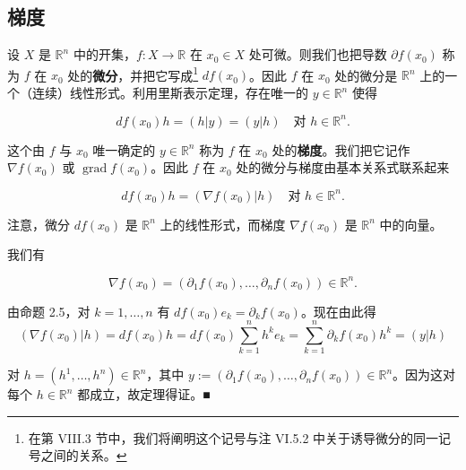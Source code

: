 \subsection*{梯度}

设 $ X $ 是 $ \mathbb{R}^n $ 中的开集，$ f : X \to \mathbb{R} $ 在 $ x_0 \in X $ 处可微。则我们也把导数 $ \partial f(x_0) $ 称为 $ f $ 在 $ x_0 $ 处的\textbf{微分}，并把它写成\footnote{在第 VIII.3 节中，我们将阐明这个记号与注 VI.5.2 中关于诱导微分的同一记号之间的关系。} $ df(x_0) $。因此 $ f $ 在 $ x_0 $ 处的微分是 $ \mathbb{R}^n $ 上的一个（连续）线性形式。利用里斯表示定理，存在唯一的 $ y \in \mathbb{R}^n $ 使得

\[
df(x_0)h = (h|y) = (y|h) \quad \text{对 } h \in \mathbb{R}^n .
\]

这个由 $ f $ 与 $ x_0 $ 唯一确定的 $ y \in \mathbb{R}^n $ 称为 $ f $ 在 $ x_0 $ 处的\textbf{梯度}。我们把它记作 $ \nabla f(x_0) $ 或 $ \operatorname{grad} f(x_0) $。因此 $ f $ 在 $ x_0 $ 处的微分与梯度由基本关系式联系起来

\[
df(x_0)h = (\nabla f(x_0)|h) \quad \text{对 } h \in \mathbb{R}^n .
\]

注意，微分 $ df(x_0) $ 是 $ \mathbb{R}^n $ 上的线性形式，而梯度 $ \nabla f(x_0) $ 是 $ \mathbb{R}^n $ 中的向量。

\begin{proposition}

我们有

\[
\nabla f(x_0) = (\partial_1 f(x_0), \ldots, \partial_n f(x_0)) \in \mathbb{R}^n .
\]

\proofhead
由命题 2.5，对 $ k = 1, \ldots, n $ 有 $ df(x_0)e_k = \partial_k f(x_0) $。现在由此得
\[
(\nabla f(x_0)|h) = df(x_0)h = df(x_0) \sum_{k=1}^{n} h^k e_k = \sum_{k=1}^{n} \partial_k f(x_0) h^k = (y|h)
\]

对 $ h = (h^1, \ldots, h^n) \in \mathbb{R}^n $，其中 $ y := (\partial_1 f(x_0), \ldots, \partial_n f(x_0)) \in \mathbb{R}^n $。因为这对每个 $ h \in \mathbb{R}^n $ 都成立，故定理得证。\nobreak\hspace{0.35em}■

\end{proposition}

